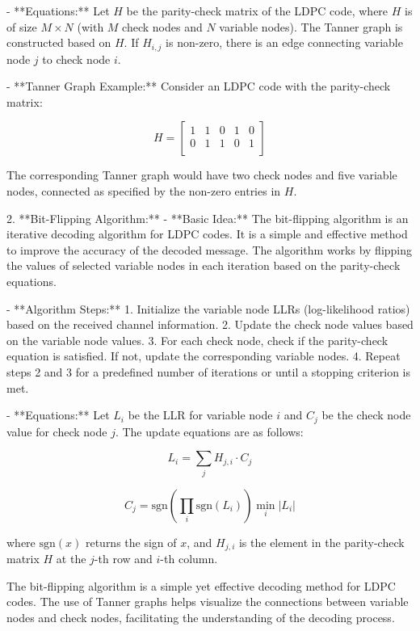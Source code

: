 \documentclass[colorlinks,11pt,a4paper,normalphoto,withhyper,ragged2e]{altareport}
\begin{document}
				- **Equations:**
				Let \(H\) be the parity-check matrix of the LDPC code, where \(H\) is of size \(M \times N\) (with \(M\) check nodes and \(N\) variable nodes). The Tanner graph is constructed based on \(H\). If \(H_{i,j}\) is non-zero, there is an edge connecting variable node \(j\) to check node \(i\).
				
				- **Tanner Graph Example:**
				Consider an LDPC code with the parity-check matrix:
				
				\[
				H = \begin{bmatrix}
					1 & 1 & 0 & 1 & 0 \\
					0 & 1 & 1 & 0 & 1 \\
				\end{bmatrix}
				\]
				
				The corresponding Tanner graph would have two check nodes and five variable nodes, connected as specified by the non-zero entries in \(H\).
				
				2. **Bit-Flipping Algorithm:**
				- **Basic Idea:** The bit-flipping algorithm is an iterative decoding algorithm for LDPC codes. It is a simple and effective method to improve the accuracy of the decoded message. The algorithm works by flipping the values of selected variable nodes in each iteration based on the parity-check equations.
				
				- **Algorithm Steps:**
				1. Initialize the variable node LLRs (log-likelihood ratios) based on the received channel information.
				2. Update the check node values based on the variable node values.
				3. For each check node, check if the parity-check equation is satisfied. If not, update the corresponding variable nodes.
				4. Repeat steps 2 and 3 for a predefined number of iterations or until a stopping criterion is met.
				
				- **Equations:**
				Let \(L_{i}\) be the LLR for variable node \(i\) and \(C_{j}\) be the check node value for check node \(j\). The update equations are as follows:
				
				\[ L_{i} = \sum_{j} H_{j,i} \cdot C_{j} \]
				
				\[ C_{j} = \text{sgn} \left( \prod_{i} \text{sgn}(L_{i}) \right) \min_{i} |L_{i}| \]
				
				where \(\text{sgn}(x)\) returns the sign of \(x\), and \(H_{j,i}\) is the element in the parity-check matrix \(H\) at the \(j\)-th row and \(i\)-th column.
				
				The bit-flipping algorithm is a simple yet effective decoding method for LDPC codes. The use of Tanner graphs helps visualize the connections between variable nodes and check nodes, facilitating the understanding of the decoding process.
				
\end{document}
